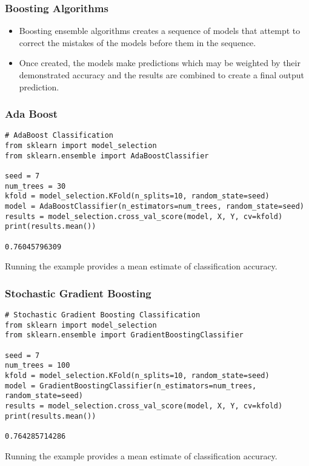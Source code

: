 \begin{frame}[fragile]\frametitle{Boosting Algorithms}

	\begin{itemize}
	\item Boosting ensemble algorithms creates a sequence of models that attempt to correct the mistakes of the models before them in the sequence.
	\item Once created, the models make predictions which may be weighted by their demonstrated accuracy and the results are combined to create a final output prediction.
	\end{itemize}
	
\end{frame}


\begin{frame}[fragile]\frametitle{Ada Boost}
\begin{lstlisting}
# AdaBoost Classification
from sklearn import model_selection
from sklearn.ensemble import AdaBoostClassifier

seed = 7
num_trees = 30
kfold = model_selection.KFold(n_splits=10, random_state=seed)
model = AdaBoostClassifier(n_estimators=num_trees, random_state=seed)
results = model_selection.cross_val_score(model, X, Y, cv=kfold)
print(results.mean())

0.76045796309
\end{lstlisting}
Running the example provides a mean estimate of classification accuracy.
\end{frame}



\begin{frame}[fragile]\frametitle{Stochastic Gradient Boosting}
\begin{lstlisting}
# Stochastic Gradient Boosting Classification
from sklearn import model_selection
from sklearn.ensemble import GradientBoostingClassifier

seed = 7
num_trees = 100
kfold = model_selection.KFold(n_splits=10, random_state=seed)
model = GradientBoostingClassifier(n_estimators=num_trees, random_state=seed)
results = model_selection.cross_val_score(model, X, Y, cv=kfold)
print(results.mean())

0.764285714286
\end{lstlisting}
Running the example provides a mean estimate of classification accuracy.
\end{frame}

